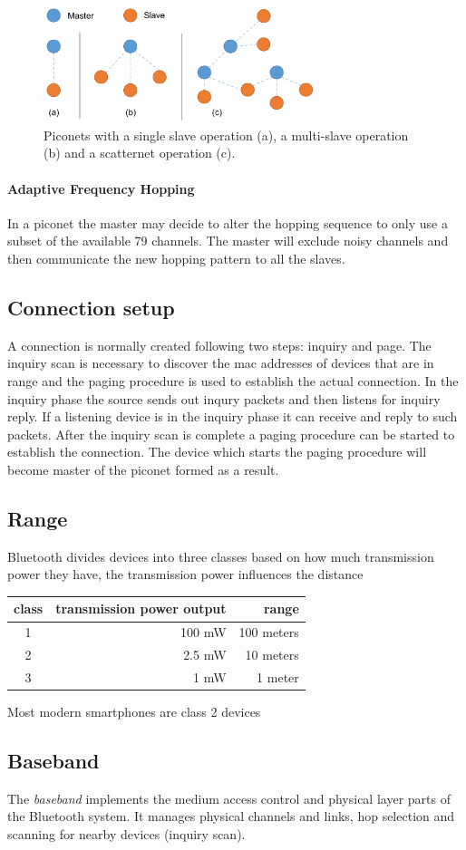 \begin{figure}[h!]
  \centering
  \includegraphics[width=0.7\textwidth]{img/piconet.png} 
  \caption{Piconets with a single slave operation (a), a multi-slave operation (b) and a scatternet operation (c).}
\end{figure}

\paragraph{Adaptive Frequency Hopping}
In a piconet the master may decide to alter the hopping sequence to only use a subset of the available 79 channels. The master will exclude  noisy channels and then communicate the new hopping pattern to all the slaves.

\subsection{Connection setup}
A connection is normally created following two steps: inquiry and page.
The inquiry scan is necessary to discover the mac addresses of devices that are in range and the paging procedure is used to establish the actual connection.
In the inquiry phase the source sends out inqury packets and then listens for inquiry reply.
If a listening device is in the inquiry phase it can receive and reply to such packets.
After the inquiry scan is complete a paging procedure can be started to establish the connection.
The device which starts the paging procedure will become master of the piconet formed as a result.

\subsection{Range}
Bluetooth divides devices into three classes based on how much transmission power they have, the transmission power influences the distance 

\vspace{0.3cm}
\begin{tabular}{|c|r|r|}
 \hline
 class & transmission power output & range \\ \hline
 1 & 100 mW & 100 meters \\
 2 & 2.5 mW & 10 meters \\
 3 & 1 mW & 1 meter \\
 \hline
\end{tabular}
\vspace{0.3cm} 

\noindent
Most modern smartphones are class 2 devices

\subsection{Baseband}
The \emph{baseband} implements the medium access control and physical layer parts of the Bluetooth system.
It manages physical channels and links, hop selection and scanning for nearby devices (inquiry scan).

